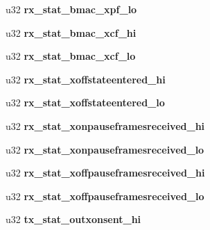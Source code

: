 \begin{DoxyCompactItemize}
\item 
\hypertarget{structbnx2x__eth__stats_a87ab511403cbda2a2a2f3a9f4a2851d5}{
u32 {\bfseries rx\_\-stat\_\-bmac\_\-xpf\_\-lo}}
\label{structbnx2x__eth__stats_a87ab511403cbda2a2a2f3a9f4a2851d5}

\item 
\hypertarget{structbnx2x__eth__stats_ac4bd5a29df6b5990590959ea4232111a}{
u32 {\bfseries rx\_\-stat\_\-bmac\_\-xcf\_\-hi}}
\label{structbnx2x__eth__stats_ac4bd5a29df6b5990590959ea4232111a}

\item 
\hypertarget{structbnx2x__eth__stats_a485a03d692e6acd99f6eb37c5a3040c7}{
u32 {\bfseries rx\_\-stat\_\-bmac\_\-xcf\_\-lo}}
\label{structbnx2x__eth__stats_a485a03d692e6acd99f6eb37c5a3040c7}

\item 
\hypertarget{structbnx2x__eth__stats_a459ddd8e40c7d4f0d5001de091cc0c1a}{
u32 {\bfseries rx\_\-stat\_\-xoffstateentered\_\-hi}}
\label{structbnx2x__eth__stats_a459ddd8e40c7d4f0d5001de091cc0c1a}

\item 
\hypertarget{structbnx2x__eth__stats_a7d41f6e0c4e7389c9e41a747f2a0323e}{
u32 {\bfseries rx\_\-stat\_\-xoffstateentered\_\-lo}}
\label{structbnx2x__eth__stats_a7d41f6e0c4e7389c9e41a747f2a0323e}

\item 
\hypertarget{structbnx2x__eth__stats_ad8c806fd8fef9b7a5bfb7ee44b77ed88}{
u32 {\bfseries rx\_\-stat\_\-xonpauseframesreceived\_\-hi}}
\label{structbnx2x__eth__stats_ad8c806fd8fef9b7a5bfb7ee44b77ed88}

\item 
\hypertarget{structbnx2x__eth__stats_aeb3921b7bf93fc9feeb7d985b15c518f}{
u32 {\bfseries rx\_\-stat\_\-xonpauseframesreceived\_\-lo}}
\label{structbnx2x__eth__stats_aeb3921b7bf93fc9feeb7d985b15c518f}

\item 
\hypertarget{structbnx2x__eth__stats_a39a56b33f99e24aa7d405c15f0d77c8d}{
u32 {\bfseries rx\_\-stat\_\-xoffpauseframesreceived\_\-hi}}
\label{structbnx2x__eth__stats_a39a56b33f99e24aa7d405c15f0d77c8d}

\item 
\hypertarget{structbnx2x__eth__stats_adad0897f0e231f39fffc8b014b9e8cc2}{
u32 {\bfseries rx\_\-stat\_\-xoffpauseframesreceived\_\-lo}}
\label{structbnx2x__eth__stats_adad0897f0e231f39fffc8b014b9e8cc2}

\item 
\hypertarget{structbnx2x__eth__stats_a6111d4e3c9777ee423e41babdbfe75e1}{
u32 {\bfseries tx\_\-stat\_\-outxonsent\_\-hi}}
\label{structbnx2x__eth__stats_a6111d4e3c9777ee423e41babdbfe75e1}


\end{DoxyCompactItemize}
